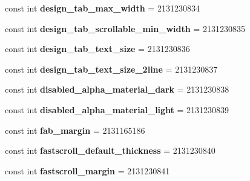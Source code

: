 \begin{DoxyCompactItemize}
const int {\bfseries design\+\_\+tab\+\_\+max\+\_\+width} = 2131230834
\item 
\mbox{\label{classst_delivery_1_1_resource_1_1_dimension_a9a35839fb860dad49860d299ff7a4769}} 
const int {\bfseries design\+\_\+tab\+\_\+scrollable\+\_\+min\+\_\+width} = 2131230835
\item 
\mbox{\label{classst_delivery_1_1_resource_1_1_dimension_ad410a76c82e6f0e404c779f8c8e39d34}} 
const int {\bfseries design\+\_\+tab\+\_\+text\+\_\+size} = 2131230836
\item 
\mbox{\label{classst_delivery_1_1_resource_1_1_dimension_a66a5669a3d49c3e61fb58976b9031caa}} 
const int {\bfseries design\+\_\+tab\+\_\+text\+\_\+size\+\_\+2line} = 2131230837
\item 
\mbox{\label{classst_delivery_1_1_resource_1_1_dimension_a5168c2c19f8528fdb5e25979696a58c4}} 
const int {\bfseries disabled\+\_\+alpha\+\_\+material\+\_\+dark} = 2131230838
\item 
\mbox{\label{classst_delivery_1_1_resource_1_1_dimension_aa3d53592b41daa350eb8cdf30c3f949c}} 
const int {\bfseries disabled\+\_\+alpha\+\_\+material\+\_\+light} = 2131230839
\item 
\mbox{\label{classst_delivery_1_1_resource_1_1_dimension_a18b0b2ec07a12800865aafda3c65d2c8}} 
const int {\bfseries fab\+\_\+margin} = 2131165186
\item 
\mbox{\label{classst_delivery_1_1_resource_1_1_dimension_a352cf09eb1e63a7dce26dbcd2e620d12}} 
const int {\bfseries fastscroll\+\_\+default\+\_\+thickness} = 2131230840
\item 
\mbox{\label{classst_delivery_1_1_resource_1_1_dimension_a5f72b78dc3c53a935d923820eb737cf4}} 
const int {\bfseries fastscroll\+\_\+margin} = 2131230841
\item 
\mbox{\label{classst_delivery_1_1_resource_1_1_dimension_ad4f3a75e5a3043418f64bde0eba575d0}} 

\end{DoxyCompactItemize}
